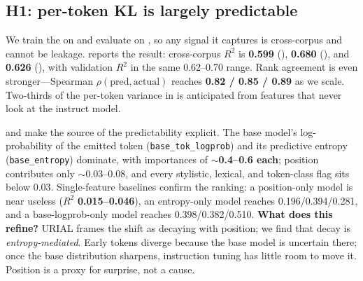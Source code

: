 \subsection{H1: per-token KL is largely predictable}

 We train the \gbt{} on \dolly{} and evaluate on \justeval{}, so any signal it captures is cross-corpus and cannot be leakage.  reports the result: cross-corpus $R^2$ is \textbf{0.599} (\qwensmall), \textbf{0.680} (\qwenmid), and \textbf{0.626} (\qwenbig), with validation $R^2$ in the same 0.62--0.70 range. Rank agreement is even stronger---Spearman $\rho(\text{pred},\text{actual})$ reaches \textbf{0.82 / 0.85 / 0.89} as we scale. Two-thirds of the per-token variance in \klt{} is anticipated from features that never look at the instruct model.



  and  make the source of the predictability explicit. The base model's log-probability of the emitted token (\texttt{base\_tok\_logprob}) and its predictive entropy (\texttt{base\_entropy}) dominate, with importances of \textbf{$\sim$0.4--0.6 each}; position contributes only $\sim$0.03--0.08, and every stylistic, lexical, and token-class flag sits below 0.03. Single-feature baselines confirm the ranking: a position-only model is near useless ($R^2$ \textbf{0.015--0.046}), an entropy-only model reaches 0.196/0.394/0.281, and a base-logprob-only model reaches 0.398/0.382/0.510. {\bf What does this refine?} URIAL frames the shift as decaying with position; we find that decay is \emph{entropy-mediated}. Early tokens diverge because the base model is uncertain there; once the base distribution sharpens, instruction tuning has little room to move it. Position is a proxy for surprise, not a cause.



